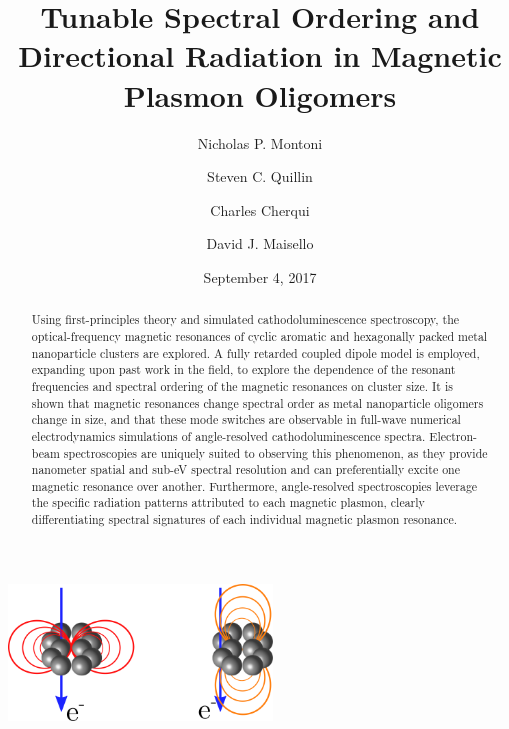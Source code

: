 \documentclass[journal=apchd5,manuscript=article]{achemso}
\author{Nicholas P. Montoni}
\author{Steven C. Quillin}
\author{Charles Cherqui}
\author{David J. Maisello}
\affiliation[Department of Chemistry, University of Washington]
{Department of Chemistry, University of Washington, Seattle, WA 98195}
\date{September 4, 2017}
\title[]
    {Tunable Spectral Ordering and Directional Radiation in Magnetic Plasmon Oligomers}
\begin{document}
\begin{tocentry}
\begin{centering}
\includegraphics[width=7cm]{toc.png}
\end{centering}
\end{tocentry}

\begin{abstract}
Using first-principles theory and simulated cathodoluminescence spectroscopy, the optical-frequency magnetic resonances of cyclic aromatic and hexagonally packed metal nanoparticle clusters are explored. A fully retarded coupled dipole model is employed, expanding upon past work in the field, to explore the dependence of the resonant frequencies and spectral ordering of the magnetic resonances on cluster size. It is shown that magnetic resonances change spectral order as metal nanoparticle oligomers change in size, and that these mode switches are observable in full-wave numerical electrodynamics simulations of angle-resolved cathodoluminescence spectra. Electron-beam spectroscopies are uniquely suited to observing this phenomenon, as they provide nanometer spatial and sub-eV spectral resolution and can preferentially excite one magnetic resonance over another. Furthermore, angle-resolved spectroscopies leverage the specific radiation patterns attributed to each magnetic plasmon, clearly differentiating spectral signatures of each individual magnetic plasmon resonance.
\end{abstract}

\end{document}
